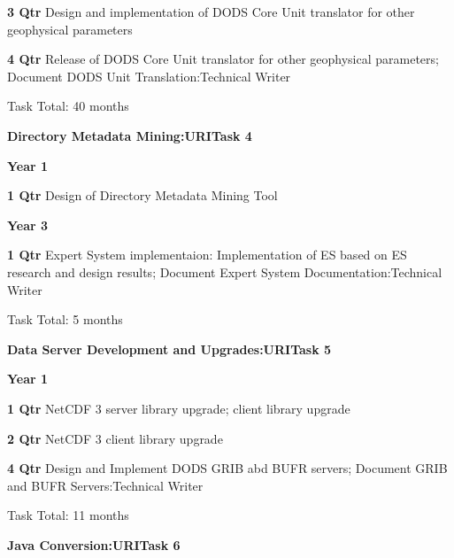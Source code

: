 \documentclass[12pt]{article}
\begin{document}
\begin{description}
\begin{description}
   \item{\bf 3 Qtr} Design and implementation of DODS Core Unit translator
     for other geophysical parameters

  \item{\bf 4 Qtr} Release of DODS Core Unit translator for other geophysical
         parameters; Document DODS Unit Translation:Technical Writer

 Task Total: 40 months 

   \end{description}
\begin{center}
{\large \bf Directory Metadata Mining:URITask 4}
\end{center}

 \item{\large \bf Year 1}
   \begin{description}
   \item{\bf 1 Qtr} Design of Directory Metadata Mining Tool

   \end{description}
 \item{\large \bf Year 3}
   \begin{description}

   \item{\bf 1 Qtr} Expert System implementaion: Implementation of ES based
     on ES research and design results; Document Expert System
     Documentation:Technical Writer

 Task Total: 5 months

   \end{description}
\begin{center}
{\large \bf Data Server Development and Upgrades:URITask 5}
\end{center}

 \item{\large \bf Year 1}
   \begin{description}
   \item{\bf 1 Qtr} NetCDF 3 server library upgrade; client library upgrade

   \item{\bf 2 Qtr} NetCDF 3 client library upgrade

   \item{\bf 4 Qtr} Design and Implement DODS GRIB abd BUFR servers; Document
     GRIB and BUFR Servers:Technical Writer

 Task Total: 11 months


   \end{description}
\begin{center}
{\large \bf Java Conversion:URITask 6}
\end{center}


\end{description}
\end{document}
